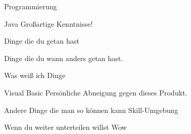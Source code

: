 \documentclass[german, green]{lebenslauf}
\begin{document}
	\begin{skill}{Programmierung}
		\begin{multicolruled}
			\begin{subskill}{Java}
				Großartige Kenntnisse!
				\begin{description}[labelindent=1em]
				  \item[Feb. 2018:] Dinge die du getan hast
				  \item[Juli 2017:] Dinge die du wann anders getan hast.
				\end{description}
			\end{subskill}

			\columnbreak

			\begin{subskill}{Was weiß ich}
				Dinge
			\end{subskill}

			\begin{subskill}{Visual Basic}
				Persönliche Abneigung gegen dieses Produkt.
			\end{subskill}

		\end{multicolruled}

	\end{skill}

	\begin{skill}{Andere Dinge die man so können kann}
		Skill-Umgebung

		\begin{subskill}{Wenn du weiter unterteilen willst}
			Wow
		\end{subskill}
	\end{skill}


\sign
\end{document}
